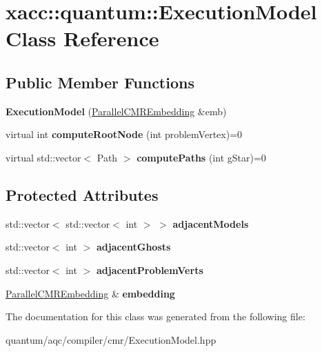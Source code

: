 \hypertarget{a00055}{}\section{xacc\+:\+:quantum\+:\+:Execution\+Model Class Reference}
\label{a00055}
\subsection*{Public Member Functions}
\begin{DoxyCompactItemize}
\item 
{\bfseries Execution\+Model} (\hyperlink{a00093}{Parallel\+C\+M\+R\+Embedding} \&emb)\hypertarget{a00055_afdd39eb2ed21da621a39408fcd338e3d}{}\label{a00055_afdd39eb2ed21da621a39408fcd338e3d}

\item 
virtual int {\bfseries compute\+Root\+Node} (int problem\+Vertex)=0\hypertarget{a00055_a3f42ece0479cf77455bf1b9055c1c29a}{}\label{a00055_a3f42ece0479cf77455bf1b9055c1c29a}

\item 
virtual std\+::vector$<$ Path $>$ {\bfseries compute\+Paths} (int g\+Star)=0\hypertarget{a00055_a915f6510b64d78969ade339c98c7c632}{}\label{a00055_a915f6510b64d78969ade339c98c7c632}

\end{DoxyCompactItemize}
\subsection*{Protected Attributes}
\begin{DoxyCompactItemize}
\item 
std\+::vector$<$ std\+::vector$<$ int $>$ $>$ {\bfseries adjacent\+Models}\hypertarget{a00055_ac9795537a9331472692dfbb5e4ca0eb5}{}\label{a00055_ac9795537a9331472692dfbb5e4ca0eb5}

\item 
std\+::vector$<$ int $>$ {\bfseries adjacent\+Ghosts}\hypertarget{a00055_af0c63456084191272e9fc20211745de8}{}\label{a00055_af0c63456084191272e9fc20211745de8}

\item 
std\+::vector$<$ int $>$ {\bfseries adjacent\+Problem\+Verts}\hypertarget{a00055_a8531d1ae712743122761cbb9bbe75254}{}\label{a00055_a8531d1ae712743122761cbb9bbe75254}

\item 
\hyperlink{a00093}{Parallel\+C\+M\+R\+Embedding} \& {\bfseries embedding}\hypertarget{a00055_a34598c554963c39c2c561c6d3d783a30}{}\label{a00055_a34598c554963c39c2c561c6d3d783a30}

\end{DoxyCompactItemize}


The documentation for this class was generated from the following file\+:\begin{DoxyCompactItemize}
\item 
quantum/aqc/compiler/cmr/\+Execution\+Model.\+hpp\end{DoxyCompactItemize}
